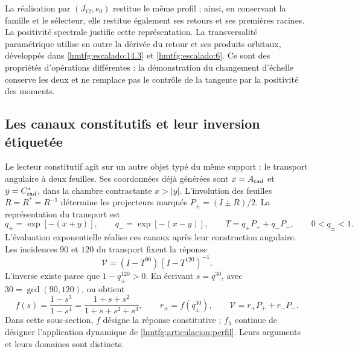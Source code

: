 La réalisation par \((J_{12},e_0)\) restitue le même profil ;
ainsi, en conservant la famille et le sélecteur, elle restitue également
ses retours et ses premières racines. La positivité spectrale
justifie cette représentation. La transversalité paramétrique
utilise en outre la dérivée du retour et ses produits orbitaux,
développés dans \ref{hmtfg:escalado:14.3} et
\ref{hmtfg:escalado:6}. Ce sont des propriétés d’opérations différentes :
la démonstration du changement d’échelle conserve les deux et ne remplace pas le
contrôle de la tangente par la positivité des moments.

\subsection{Les canaux constitutifs et leur inversion étiquetée}
\label{hmtfg:articulacion:constitutiva}

Le lecteur constitutif agit sur un autre objet typé du même
support : le transport angulaire à deux feuilles. Ses coordonnées déjà
générées sont \(x=A_{\rm rad}\) et \(y=C^*_{\rm rad}\), dans la
chambre contractante \(x>|y|\). L’involution des feuilles
\(R=R^*=R^{-1}\) détermine les projecteurs marqués
\(P_\pm=(I\pm R)/2\). La représentation du transport est
\begin{equation}
 q_+=\exp[-(x+y)],\qquad q_-=\exp[-(x-y)],\qquad
 T=q_+P_++q_-P_-,\qquad 0<q_\pm<1.
 \label{hmtfg:articulacion:canales}
\end{equation}
L’évaluation exponentielle réalise ces canaux après leur
construction angulaire. Les incidences \(90\) et \(120\) du
transport fixent la réponse
\[
 \mathcal V=(I-T^{90})(I-T^{120})^{-1}.
\]
L’inverse existe parce que \(1-q_\pm^{120}>0\).
En écrivant \(s=q^{30}\), avec \(30=\gcd(90,120)\), on obtient
\begin{equation}
 f(s)=\frac{1-s^3}{1-s^4}
     =\frac{1+s+s^2}{1+s+s^2+s^3},\qquad
 r_\pm=f(q_\pm^{30}),\qquad
 \mathcal V=r_+P_++r_-P_-.
 \label{hmtfg:articulacion:respuesta}
\end{equation}
Dans cette sous-section, \(f\) désigne la réponse constitutive ;
\(f_\lambda\) continue de désigner l’application dynamique de
\eqref{hmtfg:articulacion:perfil}. Leurs arguments et leurs domaines
sont distincts.


